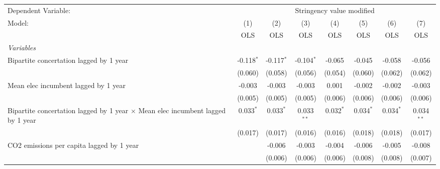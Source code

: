
\begingroup
\centering
\begin{tabular}{lccccccc}
   \toprule
   Dependent Variable: & \multicolumn{7}{c}{Stringency value modified}\\
   Model:                                                                                 & (1)          & (2)          & (3)          & (4)         & (5)         & (6)          & (7)\\  
                                                                                          &  OLS         & OLS          & OLS          & OLS         & OLS         & OLS          & OLS\\  
   \midrule
   \emph{Variables}\\
   Bipartite concertation lagged by 1 year                                                & -0.118$^{*}$ & -0.117$^{*}$ & -0.104$^{*}$ & -0.065      & -0.045      & -0.058       & -0.056\\   
                                                                                          & (0.060)      & (0.058)      & (0.056)      & (0.054)     & (0.060)     & (0.062)      & (0.062)\\   
   Mean elec incumbent lagged by 1 year                                                   & -0.003       & -0.003       & -0.003       & 0.001       & -0.002      & -0.002       & -0.003\\   
                                                                                          & (0.005)      & (0.005)      & (0.005)      & (0.006)     & (0.006)     & (0.006)      & (0.006)\\   
   Bipartite concertation lagged by 1 year $\times$ Mean elec incumbent lagged by 1 year  & 0.033$^{*}$  & 0.033$^{*}$  & 0.033$^{**}$ & 0.032$^{*}$ & 0.034$^{*}$ & 0.034$^{*}$  & 0.034$^{**}$\\   
                                                                                          & (0.017)      & (0.017)      & (0.016)      & (0.016)     & (0.018)     & (0.018)      & (0.017)\\   
   CO2 emissions per capita lagged by 1 year                                              &              & -0.006       & -0.003       & -0.004      & -0.006      & -0.005       & -0.008\\   
                                                                                          &              & (0.006)      & (0.006)      & (0.006)     & (0.008)     & (0.008)      & (0.007)\\   

\end{tabular}
